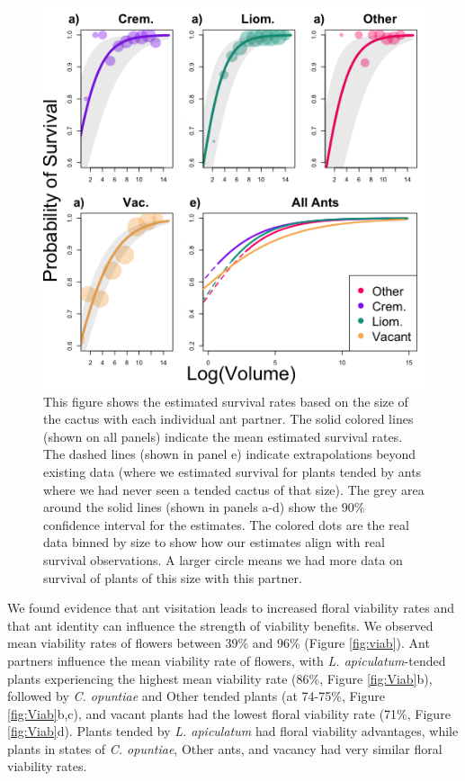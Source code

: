 \documentclass[11pt]{article}
\begin{document}
\begin{figure}[H]
\includegraphics[width=0.95\linewidth]{Figures/survival_plot.png}
\caption{This figure shows the estimated survival rates based on the size of the cactus with each individual ant partner. The solid colored lines (shown on all panels) indicate the mean estimated survival rates. The dashed lines (shown in panel e) indicate extrapolations beyond existing data (where we estimated survival for plants tended by ants where we had never seen a tended cactus of that size). The grey area around the solid lines (shown in panels a-d) show the 90\% confidence interval for the estimates. The colored dots are the real data binned by size to show how our estimates align with real survival observations. A larger circle means we had more data on survival of plants of this size with this partner.}
\label{fig:Surv}
\end{figure}

We found evidence that ant visitation leads to increased floral viability rates and that ant identity can influence the strength of viability benefits.
We observed mean viability rates of flowers between 39\% and 96\% (Figure \ref{fig:viab}).
Ant partners influence the mean viability rate of flowers, with \textit{L. apiculatum}-tended plants experiencing the highest mean viability rate (86\%, Figure \ref{fig:Viab}b), followed by \textit{C. opuntiae} and Other tended plants (at 74-75\%, Figure \ref{fig:Viab}b,c), and vacant plants had the lowest floral viability rate (71\%, Figure \ref{fig:Viab}d).
Plants tended by \textit{L. apiculatum} had floral viability advantages, while plants in states of \textit{C. opuntiae}, Other ants, and vacancy had very similar floral viability rates. 
\end{document}
